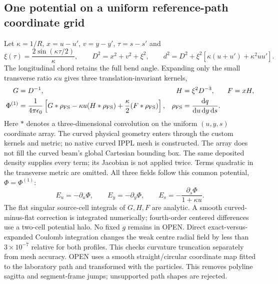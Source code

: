 \subsection{One potential on a uniform reference-path coordinate grid}
Let $\kappa=1/R$, $x=u-u'$, $v=y-y'$, $\tau=s-s'$ and
\begin{equation}
 \xi(\tau)=\frac{2\sin(\kappa\tau/2)}{\kappa},\qquad
 D^2=x^2+v^2+\xi^2,\qquad
 d^2=D^2+\xi^2[\kappa(u+u')+\kappa^2uu'].
 \label{eq:free-distance}
\end{equation}
The longitudinal chord retains the full bend angle. Expanding only the small
transverse ratio $\kappa u$ gives three translation-invariant kernels,
\begin{align}
 G&=D^{-1},& H&=\xi^2D^{-3},& F&=xH,\nonumber\\
 \Phi^{(1)}&=\frac{1}{4\pi\epsilon_0}
 \left[G*\rho_{\rm FS}-\kappa u(H*\rho_{\rm FS})
       +\frac{\kappa}{2}(F*\rho_{\rm FS})\right],
 &\rho_{\rm FS}&=\frac{\mathrm d q}{\mathrm d u\,\mathrm d y\,\mathrm d s}.
 \label{eq:free-convolution}
\end{align}
Here $*$ denotes a three-dimensional convolution on the uniform $(u,y,s)$
coordinate array. The curved physical geometry enters through the custom
kernels and metric; no native curved IPPL mesh is constructed. The array
does not fill the curved beam's global Cartesian bounding box.
The same deposited density supplies every term; its Jacobian is not applied
twice. Terms quadratic in the transverse metric are omitted. All three fields
follow this common potential, $\Phi=\Phi^{(1)}$:
\begin{equation}
 E_u=-\partial_u\Phi,\qquad E_y=-\partial_y\Phi,\qquad
 E_s=-\frac{\partial_s\Phi}{1+\kappa u}.
 \label{eq:free-gradient}
\end{equation}
The flat singular source-cell integrals of $G,H,F$ are analytic. A smooth
curved-minus-flat correction is integrated numerically; fourth-order centered
differences use a two-cell potential halo. No fixed $g$ remains in OPEN.
Direct exact-versus-expanded Coulomb integration changes the weak centre
radial field by less than $3\times10^{-7}$ relative for both profiles. This
checks curvature truncation separately from mesh accuracy.
OPEN uses a smooth straight/circular coordinate map fitted to the laboratory
path and transformed with the particles. This removes polyline sagitta and
segment-frame jumps; unsupported path shapes are rejected.



